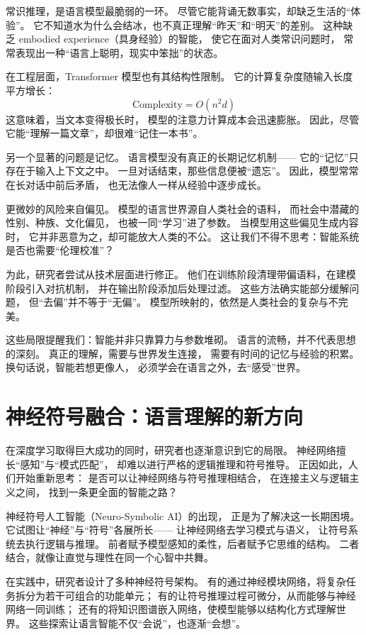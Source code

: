 常识推理，是语言模型最脆弱的一环。  
尽管它能背诵无数事实，却缺乏生活的“体验”。  
它不知道水为什么会结冰，也不真正理解“昨天”和“明天”的差别。  
这种缺乏 embodied experience（具身经验）的智能，  
使它在面对人类常识问题时，  
常常表现出一种“语言上聪明，现实中笨拙”的状态。  

在工程层面，Transformer 模型也有其结构性限制。  
它的计算复杂度随输入长度平方增长：  
\[
\text{Complexity} = O(n^2 d)
\]  
这意味着，当文本变得极长时，  
模型的注意力计算成本会迅速膨胀。  
因此，尽管它能“理解一篇文章”，却很难“记住一本书”。  

另一个显著的问题是记忆。  
语言模型没有真正的长期记忆机制——  
它的“记忆”只存在于输入上下文之中。  
一旦对话结束，那些信息便被“遗忘”。  
因此，模型常常在长对话中前后矛盾，  
也无法像人一样从经验中逐步成长。  

更微妙的风险来自偏见。  
模型的语言世界源自人类社会的语料，  
而社会中潜藏的性别、种族、文化偏见，  
也被一同“学习”进了参数。  
当模型用这些偏见生成内容时，  
它并非恶意为之，却可能放大人类的不公。  
这让我们不得不思考：智能系统是否也需要“伦理校准”？  

为此，研究者尝试从技术层面进行修正。  
他们在训练阶段清理带偏语料，在建模阶段引入对抗机制，  
并在输出阶段添加后处理过滤。  
这些方法确实能部分缓解问题，  
但“去偏”并不等于“无偏”。  
模型所映射的，依然是人类社会的复杂与不完美。  

这些局限提醒我们：智能并非只靠算力与参数堆砌。  
语言的流畅，并不代表思想的深刻。  
真正的理解，需要与世界发生连接，  
需要有时间的记忆与经验的积累。  
换句话说，智能若想更像人，  
必须学会在语言之外，去“感受”世界。  

\section{神经符号融合：语言理解的新方向}

在深度学习取得巨大成功的同时，研究者也逐渐意识到它的局限。  
神经网络擅长“感知”与“模式匹配”，  
却难以进行严格的逻辑推理和符号推导。  
正因如此，人们开始重新思考：  
是否可以让神经网络与符号推理相结合，  
在连接主义与逻辑主义之间，  
找到一条更全面的智能之路？  

神经符号人工智能（Neuro-Symbolic AI）的出现，  
正是为了解决这一长期困境。  
它试图让“神经”与“符号”各展所长——  
让神经网络去学习模式与语义，  
让符号系统去执行逻辑与推理。  
前者赋予模型感知的柔性，后者赋予它思维的结构。  
二者结合，就像让直觉与理性在同一个心智中共舞。  

在实践中，研究者设计了多种神经符号架构。  
有的通过神经模块网络，将复杂任务拆分为若干可组合的功能单元；  
有的让符号推理过程可微分，从而能够与神经网络一同训练；  
还有的将知识图谱嵌入网络，使模型能够以结构化方式理解世界。  
这些探索让语言智能不仅“会说”，也逐渐“会想”。  

